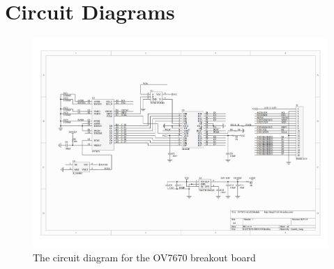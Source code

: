 \chapter{Circuit Diagrams} \label{Chapter:AppendixA:CircuitDiagrams}
\begin{figure}[ht!]
\centering
\includegraphics[angle=90,width=\textwidth,height=\textheight-10cm,keepaspectratio]{Figures/OV7670_Schematic.jpg} 
\caption{The circuit diagram for the OV7670 breakout board}
\label{OV7670_Schematic}

\end{figure}


